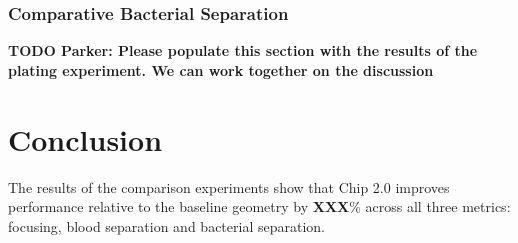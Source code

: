 \subsubsection{Comparative Bacterial Separation}
\label{sssec:comparisonBacteria}

\textbf{TODO Parker: Please populate this section with the results of the plating experiment. We can work together on the discussion}

\section{Conclusion}
\label{sec:conclusion}

The results of the comparison experiments show that Chip 2.0 improves performance relative to the baseline geometry by \textbf{XXX}\% across all three metrics: focusing, blood separation and bacterial separation.



